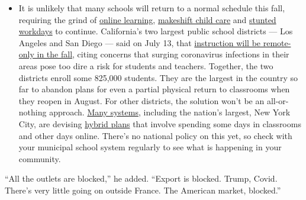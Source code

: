 \begin{itemize}
  \begin{itemize}
  \tightlist
  \item
    It is unlikely that many schools will return to a normal schedule
    this fall, requiring the grind of
    \href{https://www.nytimes3xbfgragh.onion/2020/06/05/us/coronavirus-education-lost-learning.html?action=click\&pgtype=Article\&state=default\&region=MAIN_CONTENT_3\&context=storylines_faq}{online
    learning},
    \href{https://www.nytimes3xbfgragh.onion/2020/05/29/us/coronavirus-child-care-centers.html?action=click\&pgtype=Article\&state=default\&region=MAIN_CONTENT_3\&context=storylines_faq}{makeshift
    child care} and
    \href{https://www.nytimes3xbfgragh.onion/2020/06/03/business/economy/coronavirus-working-women.html?action=click\&pgtype=Article\&state=default\&region=MAIN_CONTENT_3\&context=storylines_faq}{stunted
    workdays} to continue. California's two largest public school
    districts --- Los Angeles and San Diego --- said on July 13, that
    \href{https://www.nytimes3xbfgragh.onion/2020/07/13/us/lausd-san-diego-school-reopening.html?action=click\&pgtype=Article\&state=default\&region=MAIN_CONTENT_3\&context=storylines_faq}{instruction
    will be remote-only in the fall}, citing concerns that surging
    coronavirus infections in their areas pose too dire a risk for
    students and teachers. Together, the two districts enroll some
    825,000 students. They are the largest in the country so far to
    abandon plans for even a partial physical return to classrooms when
    they reopen in August. For other districts, the solution won't be an
    all-or-nothing approach.
    \href{https://bioethics.jhu.edu/research-and-outreach/projects/eschool-initiative/school-policy-tracker/}{Many
    systems}, including the nation's largest, New York City, are
    devising
    \href{https://www.nytimes3xbfgragh.onion/2020/06/26/us/coronavirus-schools-reopen-fall.html?action=click\&pgtype=Article\&state=default\&region=MAIN_CONTENT_3\&context=storylines_faq}{hybrid
    plans} that involve spending some days in classrooms and other days
    online. There's no national policy on this yet, so check with your
    municipal school system regularly to see what is happening in your
    community.
  \end{itemize}
\end{itemize}

``All the outlets are blocked,'' he added. ``Export is blocked. Trump,
Covid. There's very little going on outside France. The American market,
blocked.''

